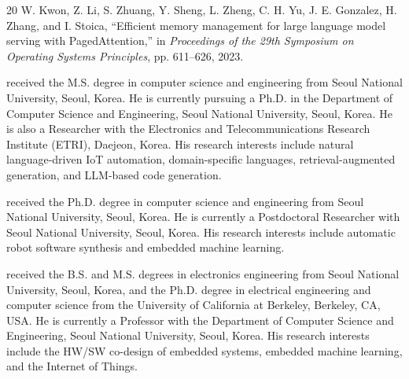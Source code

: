 \documentclass[10pt,twocolumn]{article}
\begin{document}
\begin{thebibliography}{20}
W. Kwon, Z. Li, S. Zhuang, Y. Sheng, L. Zheng, C. H. Yu, J. E. Gonzalez, H. Zhang, and I. Stoica,
``Efficient memory management for large language model serving with PagedAttention,''
in \emph{Proceedings of the 29th Symposium on Operating Systems Principles}, pp. 611--626, 2023.

\end{thebibliography}

\FloatBarrier
\begingroup
\small
\vspace{1em}

\vspace{0.7em}

 received the M.S. degree in computer science and engineering from Seoul National University, Seoul, Korea. He is currently pursuing a Ph.D. in the Department of Computer Science and Engineering, Seoul National University, Seoul, Korea. He is also a Researcher with the Electronics and Telecommunications Research Institute (ETRI), Daejeon, Korea. His research interests include natural language-driven IoT automation, domain-specific languages, retrieval-augmented generation, and LLM-based code generation.

\vspace{0.7em}

 received the Ph.D. degree in computer science and engineering from Seoul National University, Seoul, Korea. He is currently a Postdoctoral Researcher with Seoul National University, Seoul, Korea. His research interests include automatic robot software synthesis and embedded machine learning.

\vspace{0.7em}

 received the B.S. and M.S. degrees in electronics engineering from Seoul National University, Seoul, Korea, and the Ph.D. degree in electrical engineering and computer science from the University of California at Berkeley, Berkeley, CA, USA. He is currently a Professor with the Department of Computer Science and Engineering, Seoul National University, Seoul, Korea. His research interests include the HW/SW co-design of embedded systems, embedded machine learning, and the Internet of Things.

\endgroup
\end{document}

